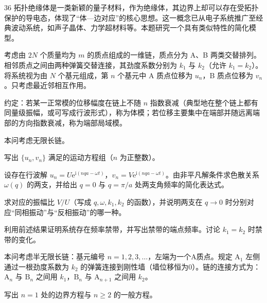 
\begin{problem}[2026年博知汇BWPhO][拓扑绝缘体]{36}
    拓扑绝缘体是一类新颖的量子材料，作为绝缘体，其边界上却可以存在受拓扑保护的导电态，体现了“体—边对应”的核心思想。这一概念已从电子系统推广至经典波动系统，如声子晶体、力学超材料等。本题研究一个具有类似特性的简化模型。

    考虑由 $2N$ 个质量均为 $m$ 的质点组成的一维链，质点分为 A、B 两类交替排列。相邻质点之间由两种弹簧交替连接，其劲度系数分别为 $k_{1}$ 与 $k_{2}$（允许 $k_{1} = k_{2}$）。将系统视为由 $N$ 个基元组成，第 $n$ 个基元中 A 质点位移为 $u_{n}$，B 质点位移为 $v_{n}$。只考虑最近邻相互作用。

    约定：若某一正常模的位移幅度在链上不随 $n$ 指数衰减（典型地在整个链上都有同量级振幅，或可写成行波形式），称为体模；若位移主要集中在端部并随远离端部的方向指数衰减，称为端部局域模。
    \begin{subproblem}
        本问考虑无限长链。
        \begin{subsubproblem}
            写出 $\{u_{n}, v_{n}\}$ 满足的运动方程组（$n$ 为正整数）。
        \end{subsubproblem}
        \begin{subsubproblem}
            设存在行波解 $u_{n} = U\mathrm{e}^{\mathrm{i}(nqa - \omega t)}$，$v_{n} = V\mathrm{e}^{\mathrm{i}(nqa - \omega t)}$。由非平凡解条件求色散关系 $\omega (q)$ 的两支，并给出 $q = 0$ 与 $q = \pi / a$ 处两支角频率的简化表达式。
        \end{subsubproblem}
        \begin{subsubproblem}
            求对应的振幅比 $V / U$（写成 $q, \omega, k_1, k_2$ 的函数），并说明两支在 $q \to 0$ 时分别对应“同相振动”与“反相振动”的哪一种。
        \end{subsubproblem}
        \begin{subsubproblem}
            利用前述结果证明系统存在频率禁带，并写出禁带的端点频率。讨论 $k_{1} = k_{2}$ 时禁带的变化。
        \end{subsubproblem}
    \end{subproblem}
    \begin{subproblem}
        本问考虑半无限长链：基元编号 $n = 1,2,3,\ldots$，左端为一个A质点。规定 $\mathrm{A}_1$ 左侧通过一根劲度系数为 $k_{2}$ 的弹簧连接到刚性墙（墙位移恒为0）。链的连接方式为：$\mathrm{A}_n$ 与 $\mathrm{B}_n$ 之间用 $k_{1}$，$\mathrm{B}_n$ 与 $\mathrm{A}_{n + 1}$ 之间用 $k_{2}$。
        \begin{subsubproblem}
            写出 $n = 1$ 处的边界方程与 $n \geq 2$ 的一般方程。
        \end{subsubproblem}

\end{subproblem}
\end{problem}
